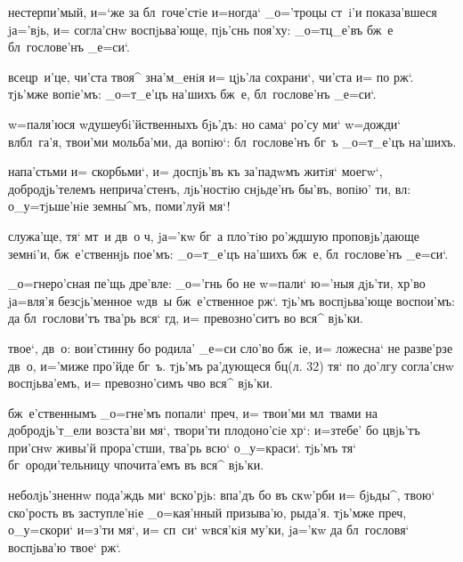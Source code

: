
нестерпи'мый, и=`же за бл~гоче'стiе и=ногда` _о='троцы 
ст~i'и показа'вшеся jа='вjь, и= согла'снw воспjьва'юще, 
пjь'снь поя'ху: _о=тц_е'въ бж~е бл~гослове'нъ _е=си`.

всецр~и'це, чи'ста твоя^ зна'м_енiя и= цjь'ла сохрани`, 
чи'ста и= по рж`. тjь'мже вопiе'мъ: _о=т_е'цъ 
на'шихъ бж~е, бл~гослове'нъ _е=си`.

w=паля'юся w\т душеубi'йственныхъ бjь'дъ: но сама` ро'су 
ми` w=дожди` вл бл~га'я, твои'ми мольба'ми, да 
вопiю`: бл~гослове'нъ бг~ъ _о=т_е'цъ на'шихъ.

напа'стьми и= скорбьми`, и= доспjь'въ къ за'падwмъ житiя` 
моегw`, добродjь'телемъ неприча'стенъ, лjь'ностiю 
снjьде'нъ бы'въ, вопiю' ти, вл: о_у=тjьше'нiе 
земны^мъ, поми'луй мя`!

служа'ще, тя` мт~и дв~о ч, jа='кw бг~а пло'тiю 
ро'ждшую проповjь'дающе земнi'и, бж~е'ственнjь пое'мъ: 
_о=т_е'цъ на'шихъ бж~е, бл~гослове'нъ _е=си`.


_о=гнеро'сная пе'щь дре'вле: _о='гнь бо не w=пали` ю='ныя 
дjь'ти, хр'во jа=вля'я безсjь'менное w\т дв~ы 
бж~е'ственное рж`. тjь'мъ воспjьва'юще воспои'мъ: да 
бл~гослови'тъ тва'рь вся` гд, и= превозно'ситъ во вся^ 
вjь'ки.

твое`, дв~о: вои'стинну бо родила' _е=си сло'во бж~iе, и= 
ложесна` не разве'рзе дв~о, и='миже про'йде бг~ъ. тjь'мъ 
ра'дующеся бц (л. 32) тя` по до'лгу согла'снw 
воспjьва'емъ, и= превозно'симъ ч во вся^ вjь'ки.

бж~е'ственнымъ _о=гне'мъ попали` преч, и= твои'ми 
мл~твами на добродjь'т_ели возста'ви мя`, твори'ти 
плодоно'сiе хр`: и=з\ъ тебе' бо цвjь'тъ при'снw 
живы'й прора'стши, тва'рь всю` о_у=краси`. тjь'мъ тя` 
бг~ороди'тельницу ч почита'емъ въ вся^ вjь'ки.

неболjь'зненнw пода'ждь ми` вско'рjь: впа'дъ бо въ 
скw'рби и= бjьды^, твою` ско'рость въ заступле'нiе 
_о=кая'нный призыва'ю, рыда'я. тjь'мже преч, 
о_у=скори` и=з'ти мя`, и= сп~си` w\т вся'кiя му'ки, 
jа='кw да бл~гословя` воспjьва'ю твое` рж`.

